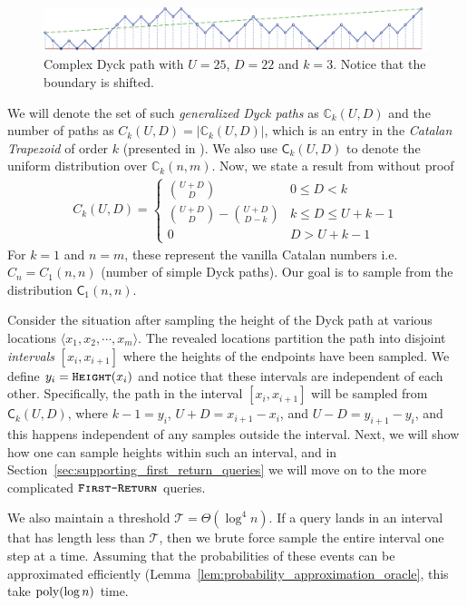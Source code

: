 \begin{figure}[htbp]
    \centering
    \includegraphics[width=\textwidth]{images/complex_dyck_path.pdf}
    \caption{Complex Dyck path with $U = 25$, $D = 22$ and $k = 3$.
             Notice that the boundary is shifted.} \label{fig:complex_dyck}
\end{figure}

We will denote the set of such \emph{generalized Dyck paths} as $\mathbb C_k(U,D)$ and the number of paths as $C_k(U,D) = |\mathbb C_k(U,D)|$,
which is an entry in the \textit{Catalan Trapezoid} of order $k$ (presented in \cite{trap}).
We also use $\mathsf C_k(U,D)$ to denote the uniform distribution over $\mathbb C_k(n,m)$.
Now, we state a result from \cite{trap} without proof
\begin{align}
    \label{eq:catalan_trapezoid}
    C_k(U,D)=
    \begin{cases}
    \binom{U+D}{D} &0\le D<k\\
    \binom{U+D}{D} - \binom{U+D}{D-k} &k\le D\le U+k-1\\
    0 &D>U+k-1
    \end{cases}
\end{align}
For $k = 1$ and $n=m$, these represent the vanilla Catalan numbers i.e. $C_n = C_1(n,n)$ (number of simple Dyck paths).
Our goal is to sample from the distribution $\mathsf C_1(n,n)$.

Consider the situation after sampling the height of the Dyck path at various locations $\langle x_1, x_2,\cdots, x_m \rangle$.
The revealed locations partition the path into disjoint \emph{intervals} $[x_i,x_{i+1}]$ where the heights of the endpoints have been sampled.
We define $y_i = \texttt{\textsc{Height}}(x_i)$ and notice that these intervals are independent of each other.
Specifically, the path in the interval $[x_i, x_{i+1}]$ will be sampled from $\mathsf C_k(U,D)$,
where $k - 1 = y_i$, $U + D = x_{i+1} - x_i$, and $U-D = y_{i+1} - y_i$, and this happens independent of any samples outside the interval.
Next, we will show how one can sample heights within such an interval,
and in Section~\ref{sec:supporting_first_return_queries} we will move on to the more complicated $\texttt{\textsc{First-Return}}$ queries.

We also maintain a threshold $\mathcal T = \Theta(\log^4 n)$.
If a query lands in an interval that has length less than $\mathcal T$, then we brute force sample the entire interval one step at a time.
Assuming that the probabilities of these events can be approximated efficiently (Lemma~\ref{lem:probability_approximation_oracle},
this take $\mathrm{poly}(\log n)$ time.



